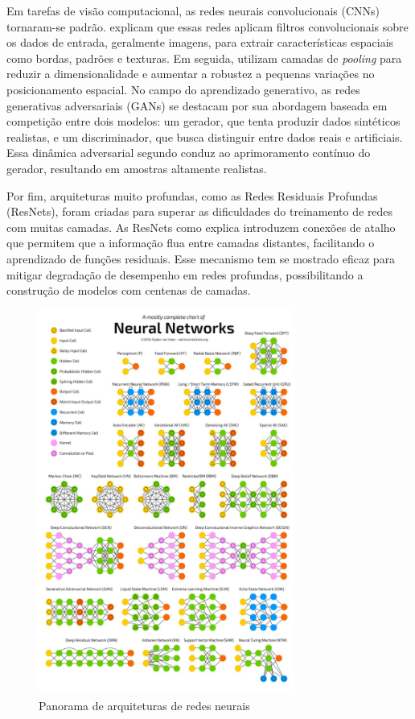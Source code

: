 Em tarefas de visão computacional, as redes neurais convolucionais (CNNs) tornaram-se padrão.  explicam que essas redes aplicam filtros convolucionais sobre os dados de entrada, geralmente imagens, para extrair características espaciais como bordas, padrões e texturas. Em seguida, utilizam camadas de \textit{pooling} para reduzir a dimensionalidade e aumentar a robustez a pequenas variações no posicionamento espacial. No campo do aprendizado generativo, as redes generativas adversariais (GANs) se destacam por sua abordagem baseada em competição entre dois modelos: um gerador, que tenta produzir dados sintéticos realistas, e um discriminador, que busca distinguir entre dados reais e artificiais. Essa dinâmica adversarial segundo   conduz ao aprimoramento contínuo do gerador, resultando em amostras altamente realistas.

Por fim, arquiteturas muito profundas, como as Redes Residuais Profundas (ResNets), foram criadas para superar as dificuldades do treinamento de redes com muitas camadas. As ResNets como explica  introduzem conexões de atalho que permitem que a informação flua entre camadas distantes, facilitando o aprendizado de funções residuais. Esse mecanismo tem se mostrado eficaz para mitigar degradação de desempenho em redes profundas, possibilitando a construção de modelos com centenas de camadas.

\begin{figure}[!htbp]
  \centering
  \includegraphics[width=0.75\textwidth]{imgs/neural_networks.jpeg}
  \caption{Panorama de arquiteturas de redes neurais \cite{asimov2017}}
  \label{fig:nnzoo}
\end{figure}

